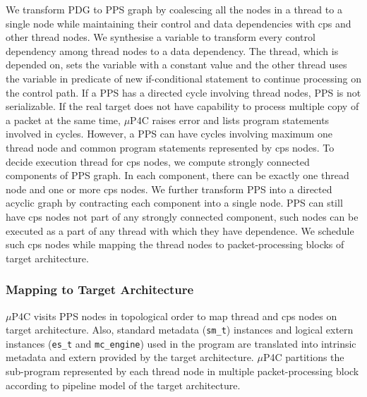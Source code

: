 

We transform PDG to PPS graph by coalescing all the nodes in a thread to a single node while maintaining their control and data dependencies with cps and other thread nodes.
We synthesise a variable to transform every control dependency among thread nodes to a data dependency.
The thread, which is depended on, sets the variable with a constant value and the other thread uses the variable in predicate of new if-conditional statement to continue processing on the control path.
If a PPS has a directed cycle involving thread nodes, PPS is not serializable.
If the real target does not have capability to process multiple copy of a packet at the same time, 
$\mu$P4C raises error and lists program statements involved in cycles.
However, a PPS can have cycles involving maximum one thread node and common program statements represented by cps nodes.
To decide execution thread for cps nodes, we compute strongly connected components of PPS graph.
In each component, there can be exactly one thread node and one or more cps nodes.
We further transform PPS into a directed acyclic graph by contracting each component into a single node.
PPS can still have cps nodes not part of any strongly connected component, such nodes can be executed as a part of any thread with which they have dependence.
We schedule such cps nodes while mapping the thread nodes to packet-processing blocks of target architecture.






\subsubsection{Mapping to Target Architecture}
$\mu$P4C visits PPS nodes in topological order to map thread and cps nodes on target architecture.
Also, standard metadata (\texttt{sm\_t}) instances and logical extern instances (\texttt{es\_t} and \texttt{mc\_engine}) used in the program are translated into intrinsic metadata and extern provided by the target architecture.
$\mu$P4C partitions the sub-program represented by each thread node in multiple packet-processing block according to pipeline model of the target architecture.


